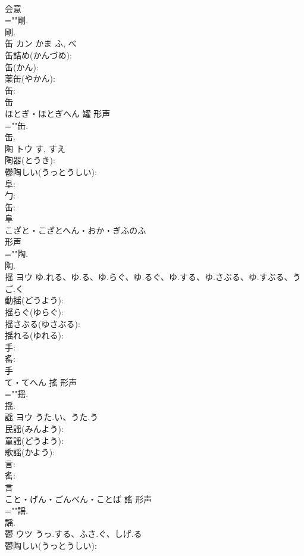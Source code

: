 \documentclass[8pt]{extreport}
\begin{document}
\begin{CJK}{UTF8}{min}
\\	会意 
\\	=""剛.
\\	剛.
\\	缶	カン	かま	ふ, べ	
\\	缶詰め(かんづめ): 
\\	缶(かん): 
\\	薬缶(やかん): 
\\	缶: 
\\	缶	
\\	ほとぎ・ほとぎへん	罐	形声 
\\	=""缶.
\\	缶.
\\	陶	トウ		す, すえ	
\\	陶器(とうき): 
\\	鬱陶しい(うっとうしい): 
\\	阜: 
\\	勹: 
\\	缶: 
\\	阜	
\\	こざと・こざとへん・おか・ぎふのふ	
\\	形声 
\\	=""陶.
\\	陶.
\\	揺	ヨウ	ゆ.れる、ゆ.る、ゆ.らぐ、ゆ.るぐ、ゆ.する、ゆ.さぶる、ゆ.すぶる、うご.く		
\\	動揺(どうよう): 
\\	揺らぐ(ゆらぐ): 
\\	揺さぶる(ゆさぶる): 
\\	揺れる(ゆれる): 
\\	手: 
\\	䍃: 
\\	手	
\\	て・てへん	搖	形声 
\\	=""揺.
\\	揺.
\\	謡	ヨウ	うた.い、うた.う		
\\	民謡(みんよう): 
\\	童謡(どうよう): 
\\	歌謡(かよう): 
\\	言: 
\\	䍃: 
\\	言	
\\	こと・げん・ごんべん・ことば	謠	形声 
\\	=""謡.
\\	謡.
\\	鬱	ウツ	うっ.する、ふさ.ぐ、しげ.る		
\\	鬱陶しい(うっとうしい): 

\end{CJK}
\end{document}
